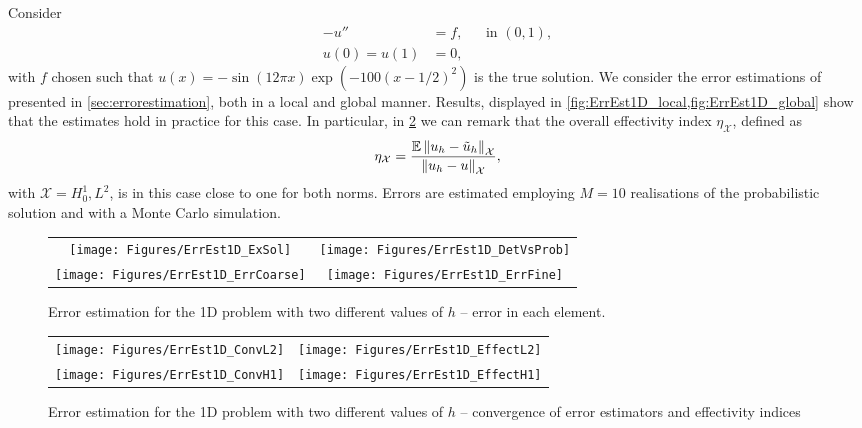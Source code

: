 \documentclass[10pt]{article}
\begin{document}
Consider
\begin{equation}
\begin{aligned}
	-u'' &= f, &&\text{in } (0,1), \\
	u(0) = u(1) &= 0,
\end{aligned}
\end{equation}
with $f$ chosen such that $u(x) = -\sin(12\pi x) \exp(-100(x-1/2)^2)$ is the true solution. We consider the error estimations of presented in \cref{sec:errorestimation}, both in a local and global manner. Results, displayed in \cref{fig:ErrEst1D_local,fig:ErrEst1D_global} show that the estimates hold in practice for this case. In particular, in \cref{fig:ErrEst1D_global} we can remark that the overall effectivity index $\eta_{\mathcal X}$, defined as
\begin{equation}
	\eta_{\mathcal X} = \frac{\operatorname{\mathbb{E}}\left\|u_h - \tilde u_h\right\|_{\mathcal X}}{\left\|u_h - u\right\|_{\mathcal X}},
\end{equation}
with $\mathcal X = H_0^1, L^2$, is in this case close to one for both norms. Errors are estimated employing $M = 10$ realisations of the probabilistic solution and with a Monte Carlo simulation.

\begin{figure}[t]
	\centering
	\begin{tabular}{cc}
		\texttt{[image: Figures/ErrEst1D\_ExSol]} & \texttt{[image: Figures/ErrEst1D\_DetVsProb]} \\
		\texttt{[image: Figures/ErrEst1D\_ErrCoarse]} & \texttt{[image: Figures/ErrEst1D\_ErrFine]} \\
	\end{tabular}
	\caption{Error estimation for the 1D problem with two different values of $h$ -- error in each element.}
	\label{fig:ErrEst1D_local}
\end{figure}

\begin{figure}[t]
	\centering
	\begin{tabular}{cc}
		\texttt{[image: Figures/ErrEst1D\_ConvL2]} & \texttt{[image: Figures/ErrEst1D\_EffectL2]} \\
		\texttt{[image: Figures/ErrEst1D\_ConvH1]} & \texttt{[image: Figures/ErrEst1D\_EffectH1]} \\
	\end{tabular}
	\caption{Error estimation for the 1D problem with two different values of $h$ -- convergence of error estimators and effectivity indices}
	\label{fig:ErrEst1D_global}
\end{figure}
\end{document}
